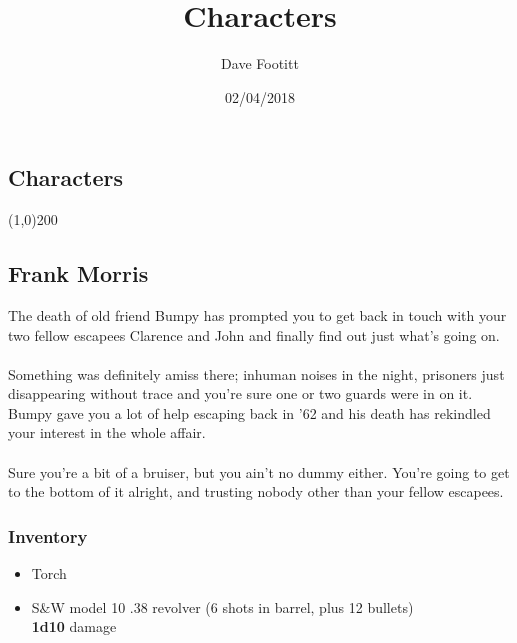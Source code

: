 \documentclass[12pt,a4paper]{article}
\author{Dave Footitt}
\title{Characters}
\date{02/04/2018}
\begin{document}
\begin{center}
\section*{Characters}
\line(1,0){200}
\end{center}
\vspace{1em}
\subsection*{Frank Morris}
The death of old friend Bumpy has prompted you to get back in touch with your two fellow escapees Clarence and John and finally find out just what's going on.\\\\
Something was definitely amiss there; inhuman noises in the night, prisoners just disappearing without trace and you're sure one or two guards were in on it.  Bumpy gave you a lot of help escaping back in '62 and his death has rekindled your interest in the whole affair.\\\\
Sure you're a bit of a bruiser, but you ain't no dummy either.  You're going to get to the bottom of it alright, and trusting nobody other than your fellow escapees.
\subsubsection*{Inventory}
\begin{itemize}
\item{Torch}
\item{S\&W model 10 .38 revolver (6 shots in barrel, plus 12 bullets)}\\\textbf{1d10} damage
\end{itemize}
\newpage
\end{document}
